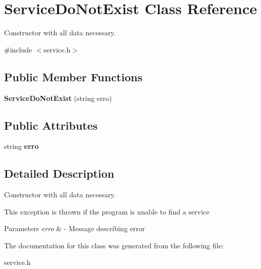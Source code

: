 \hypertarget{class_service_do_not_exist}{}\section{Service\+Do\+Not\+Exist Class Reference}
\label{class_service_do_not_exist}


Constructor with all data necessary.  




{\ttfamily \#include $<$service.\+h$>$}

\subsection*{Public Member Functions}
\begin{DoxyCompactItemize}
\item 
\mbox{\label{class_service_do_not_exist_a972a9da7853eb19d42c57b8661bbbe9d}} 
{\bfseries Service\+Do\+Not\+Exist} (string erro)
\end{DoxyCompactItemize}
\subsection*{Public Attributes}
\begin{DoxyCompactItemize}
\item 
\mbox{\label{class_service_do_not_exist_a8915a28a1a9b0f2c85a411be65b34c91}} 
string {\bfseries erro}
\end{DoxyCompactItemize}


\subsection{Detailed Description}
Constructor with all data necessary. 

This exception is thrown if the program is unable to find a service


\begin{DoxyParams}{Parameters}
{\em erro} & -\/ Message describing error \\
\hline
\end{DoxyParams}


The documentation for this class was generated from the following file\+:\begin{DoxyCompactItemize}
\item 
service.\+h\end{DoxyCompactItemize}
